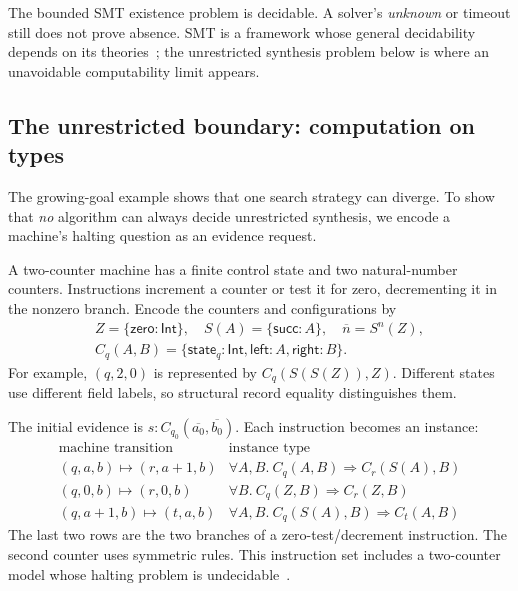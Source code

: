 \documentclass[10pt,a4paper]{article}
\newcommand{\Int}{\mathsf{Int}}
\newcommand{\kw}[1]{\mathsf{#1}}
\begin{document}
The bounded SMT existence problem is decidable. A solver's \emph{unknown} or timeout
still does not prove absence. SMT is a framework whose general decidability depends
on its theories~\cite{smt-theories}; the unrestricted synthesis problem below is
where an unavoidable computability limit appears.

\newpage
\subsection{The unrestricted boundary: computation on types}
\label{sec:unbounded-undecidability}
The growing-goal example shows that one search strategy can diverge. To show that
\emph{no} algorithm can always decide unrestricted synthesis, we encode a machine's
halting question as an evidence request.

A two-counter machine has a finite control state and two natural-number counters.
Instructions increment a counter or test it for zero, decrementing it in the
nonzero branch. Encode the counters and configurations by
\[
\begin{gathered}
 Z=\{\kw{zero}:\Int\},\quad S(A)=\{\kw{succ}:A\},\quad \overline n=S^n(Z),\\
 C_q(A,B)=\{\kw{state}_q:\Int,\kw{left}:A,\kw{right}:B\}.
\end{gathered}
\]
For example, $(q,2,0)$ is represented by $C_q(S(S(Z)),Z)$.
Different states use different field labels, so structural record equality
distinguishes them.

The initial evidence is $s:C_{q_0}(\overline{a_0},\overline{b_0})$.
Each instruction becomes an instance:
\[
\begin{array}{l|l}
 \text{machine transition} & \text{instance type}\\ \hline
 (q,a,b)\mapsto(r,a+1,b)
   & \forall A,B.\ C_q(A,B)\Rightarrow C_r(S(A),B)\\[3pt]
 (q,0,b)\mapsto(r,0,b)
   & \forall B.\ C_q(Z,B)\Rightarrow C_r(Z,B)\\[3pt]
 (q,a+1,b)\mapsto(t,a,b)
   & \forall A,B.\ C_q(S(A),B)\Rightarrow C_t(A,B)
\end{array}
\]
The last two rows are the two branches of a zero-test/decrement instruction.
The second counter uses symmetric rules. This instruction set includes a
two-counter model whose halting problem is undecidable~\cite{dudenhefner2022}.
\end{document}

